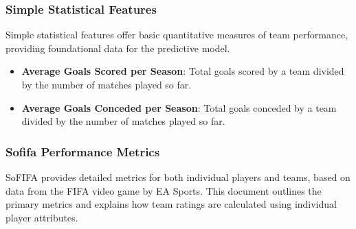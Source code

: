 \subsubsection{Simple Statistical Features}


Simple statistical features offer basic quantitative measures of team performance, providing foundational data for the predictive model.


\begin{itemize}
    \item \textbf{Average Goals Scored per Season}: Total goals scored by a team divided by the number of matches played so far.
    
    \item \textbf{Average Goals Conceded per Season}: Total goals conceded by a team divided by the number of matches played so far.
\end{itemize}


\subsubsection{Sofifa Performance Metrics}

SoFIFA provides detailed metrics for both individual players and teams, based on data from the FIFA video game by EA Sports. This document outlines the primary metrics and explains how team ratings are calculated using individual player attributes.

